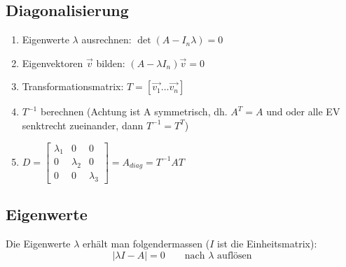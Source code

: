 \begin{multicols}{2}
 \subsection{Diagonalisierung}
 	\begin{enumerate}
       \item Eigenwerte $\lambda$ ausrechnen: $\det (A - I_n \lambda)=0$
       \item Eigenvektoren $\vec{v}$ bilden: $(A- \lambda I_n)\vec{v}=0$
       \item Transformationsmatrix: $T= [\vec{v_1} \ldots \vec{v_n}]$
       \item $T^{-1}$ berechnen (Achtung ist A symmetrisch, dh. $A^T=A$ und
       oder alle EV senktrecht zueinander, dann $T^{-1}=T^T$)
       \item $D=\begin{bmatrix}
                	\lambda_1 &0 &0\\
                	0& \lambda_2 &0\\
                	0& 0& \lambda_3
                \end{bmatrix} = A_{diag} = T^{-1}AT$
     \end{enumerate}

\columnbreak   
     
\subsection{Eigenwerte}
  Die Eigenwerte $\lambda$ erhält man folgendermassen ($I$ ist die Einheitsmatrix):
  \[ |\lambda I - A| = 0 \qquad \text{nach } \lambda \text{ auflösen} \]
\end{multicols}

